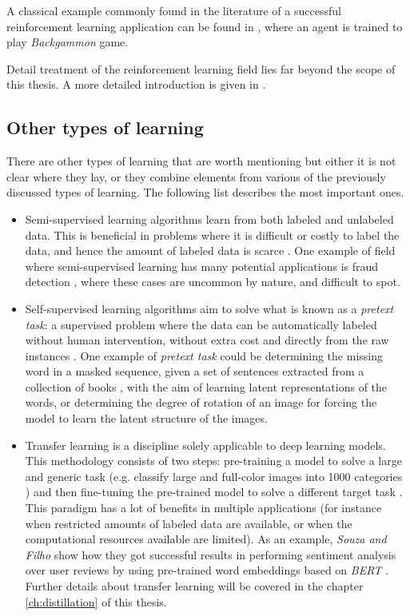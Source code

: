 A classical example commonly found in the literature of a successful reinforcement learning application can be found in \autocite{tesauro1994}, where an agent is trained to play \textit{Backgammon} game.

Detail treatment of the reinforcement learning field lies far beyond the scope of this thesis. A more detailed introduction is given in \autocite{sutton2018, szepesvari2010}.

\subsection{Other types of learning} \label{sec:typesoflearning_others}
There are other types of learning \autocite{raghu2020} that are worth mentioning but either it is not clear where they lay, or they combine elements from various of the previously discussed types of learning. The following list describes the most important ones.
\begin{itemize}
	\item Semi-supervised learning algorithms learn from both labeled and unlabeled data. This is beneficial in problems where it is difficult or costly to label the data, and hence the amount of labeled data is scarce \autocite{raghu2020}. One example of field where semi-supervised learning has many potential applications is fraud detection \autocite{wang2020b}, where these cases are uncommon by nature, and difficult to spot.
	\item Self-supervised learning algorithms aim to solve what is known as a \textit{pretext task}: a supervised problem where the data can be automatically labeled without human intervention, without extra cost and directly from the raw instances \autocite{raghu2020}. One example of \textit{pretext task} could be determining the missing word in a masked sequence, given a set of sentences extracted from a collection of books \autocite{devlin2019}, with the aim of learning latent representations of the words, or determining the degree of rotation of an image \autocite{gidaris2018} for forcing the model to learn the latent structure of the images.
	\item Transfer learning is a discipline solely applicable to deep learning models. This methodology consists of two steps: pre-training a model to solve a large and generic task (e.g. classify large and full-color images into 1000 categories \autocite{deng2009imagenet}) and then fine-tuning the pre-trained model to solve a different target task \autocite{raghu2020}. This paradigm has a lot of benefits in multiple applications (for instance when restricted amounts of labeled data are available, or when the computational resources available are limited). As an example, \textit{Souza and Filho} \autocite{souza2022} show how they got successful results in performing sentiment analysis over user reviews by using pre-trained word embeddings based on \textit{BERT} \autocite{devlin2019}. Further details about transfer learning will be covered in the chapter \ref{ch:distillation} of this thesis.
\end{itemize}


